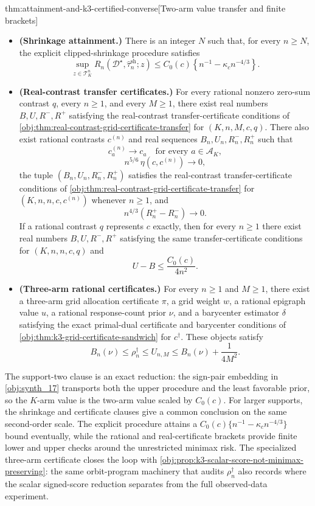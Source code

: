 \documentclass[11pt]{article}
\begin{document}
\begin{theoremv}{thm:attainment-and-k3-certified-converse}[Two-arm value transfer and finite brackets]
\begin{itemize}
\item \textbf{(Shrinkage attainment.)} There is an integer \(N\) such that, for every \(n\ge N\), the explicit clipped-shrinkage procedure satisfies
\[
\sup_{z\in\mathcal T_K^n}
R_n(\mathcal D^\star,\widehat\tau_n^{\mathrm{sh}};z)
\le
C_0(c)\left\{n^{-1}-\kappa_c n^{-4/3}\right\}.
\]

\item \textbf{(Real-contrast transfer certificates.)} For every rational nonzero zero-sum contrast \(q\), every \(n\ge 1\), and every \(M\ge 1\), there exist real numbers \(B,U,R^-,R^+\) satisfying the real-contrast transfer-certificate conditions of \cref{obj:thm:real-contrast-grid-certificate-transfer} for \((K,n,M,c,q)\). There also exist rational contrasts \(c^{(n)}\) and real sequences \(B_n,U_n,R_n^-,R_n^+\) such that
\[
c^{(n)}_a\to c_a
\quad\text{for every }a\in\mathcal A_K,
\]
\[
n^{5/6}\,\eta(c,c^{(n)})\to 0,
\]
the tuple \((B_n,U_n,R_n^-,R_n^+)\) satisfies the real-contrast transfer-certificate conditions of \cref{obj:thm:real-contrast-grid-certificate-transfer} for \((K,n,n,c,c^{(n)})\) whenever \(n\ge 1\), and
\[
n^{4/3}(R_n^+-R_n^-)\to 0.
\]
If a rational contrast \(q\) represents \(c\) exactly, then for every \(n\ge 1\) there exist real numbers \(B,U,R^-,R^+\) satisfying the same transfer-certificate conditions for \((K,n,n,c,q)\) and
\[
U-B\le \frac{C_0(c)}{4n^2}.
\]

\item \textbf{(Three-arm rational certificates.)} For every \(n\ge 1\) and \(M\ge 1\), there exist a three-arm grid allocation certificate \(\pi\), a grid weight \(w\), a rational epigraph value \(u\), a rational response-count prior \(\nu\), and a barycenter estimator \(\delta\) satisfying the exact primal-dual certificate and barycenter conditions of \cref{obj:thm:k3-grid-certificate-sandwich} for \(c^\dagger\). These objects satisfy
\[
B_n(\nu)\le \rho_n^\dagger\le U_{n,M}
\le B_n(\nu)+\frac{1}{4M^2}.
\]
\end{itemize}
\end{theoremv}

The support-two clause is an exact reduction: the sign-pair embedding in \cref{obj:synth_17} transports both the upper procedure and the least favorable prior, so the \(K\)-arm value is the two-arm value scaled by \(C_0(c)\). For larger supports, the shrinkage and certificate clauses give a common conclusion on the same second-order scale. The explicit procedure attains a \(C_0(c)\{n^{-1}-\kappa_c n^{-4/3}\}\) bound eventually, while the rational and real-certificate brackets provide finite lower and upper checks around the unrestricted minimax risk. The specialized three-arm certificate closes the loop with \cref{obj:prop:k3-scalar-score-not-minimax-preserving}: the same orbit-program machinery that audits \(\rho_n^\dagger\) also records where the scalar signed-score reduction separates from the full observed-data experiment.
\end{document}
